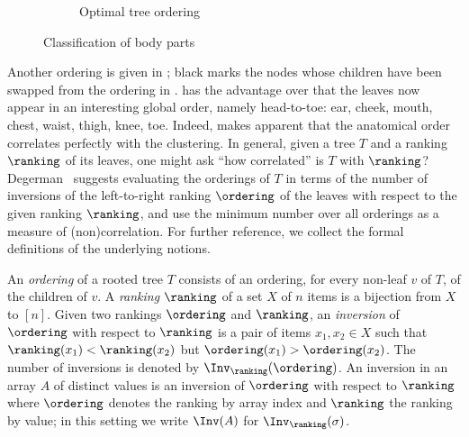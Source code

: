 \begin{figure}[ht]
\begin{subfigure}[b]{0.45\textwidth}
\caption{Optimal tree ordering}\label{fig:example:optimal}
\end{subfigure}
\caption{Classification of body parts}\label{fig:example}
\end{figure}

Another ordering is given in ; black marks the nodes whose children have been swapped from the ordering in .  has the advantage over  that the leaves now appear in an interesting global order, namely head-to-toe: ear, cheek, mouth, chest, waist, thigh, knee, toe. Indeed,  makes apparent that the anatomical order correlates perfectly with the clustering. In general, given a tree $T$ and a ranking $\ranking$ of its leaves, one might ask ``how correlated'' is $T$ with $\ranking$? Degerman~\cite{Degerman1982} suggests evaluating the orderings of $T$ in terms of the number of inversions of the left-to-right ranking $\ordering$ of the leaves with respect to the given ranking $\ranking$, and use the minimum number over all orderings as a measure of (non)correlation. For further reference, we collect the formal definitions of the underlying notions.
\begin{definition}
An \emph{ordering} of a rooted tree $T$ consists of an ordering, for every non-leaf $v$ of $T$, of the children of $v$. 
A \emph{ranking} $\ranking$ of a set $X$ of $n$ items is a bijection from $X$ to $[n]$. 
Given two rankings $\ordering$ and $\ranking$, an \emph{inversion} of $\ordering$ with respect to $\ranking$ is a pair of items $x_1,x_2\in X$ such that $\ranking(x_1) < \ranking(x_2)$ but $\ordering(x_1) > \ordering(x_2)$. The number of inversions is denoted by $\Inv_\ranking(\ordering)$.
An inversion in an array $A$ of
%
%
%
distinct values is an inversion of $\ordering$ with respect to $\ranking$ where $\ordering$ denotes the ranking by array index and $\ranking$ the ranking by value; in this setting we write $\Inv(A)$ for $\Inv_\ranking(\sigma)$.
\end{definition}

